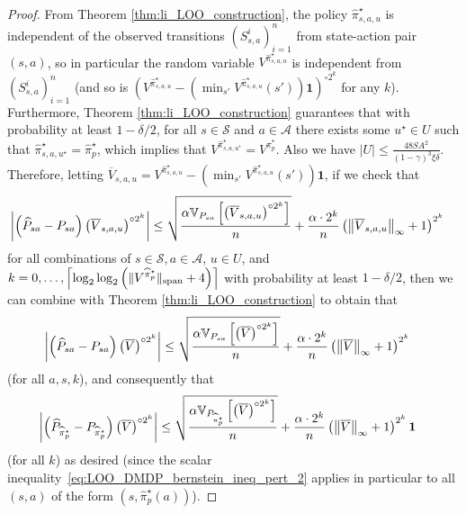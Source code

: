 \documentclass{article}
\theoremstyle{plain}
\theoremstyle{plain}
\theoremstyle{remark}
\theoremstyle{plain}
\theoremstyle{plain}
\newcommand{\Var}{\mathbb{V}}
\newcommand{\Phat}{\widehat{P}}
\newcommand{\pihstar}{\widehat{\pi}^\star}
\newcommand{\one}{\mathbf{1}}
\newcommand{\pihat}{\widehat{\pi}}
\newcommand{\Vc}{\overline{V}}
\newcommand{\A}{\mathcal{A}}
\renewcommand{\S}{\mathcal{S}}
\newcommand{\pihatpert}{\pihat^\star_p}
\begin{document}
\begin{proof} 
    From Theorem \ref{thm:li_LOO_construction}, the policy $\pihstar_{s,a,u}$ is independent of the observed transitions $(S^i_{s,a})_{i=1}^n$ from state-action pair $(s,a)$, so in particular the random variable $V^{\pihstar_{s,a,u}}$ is independent from $(S^i_{s,a})_{i=1}^n$ (and so is $\left(V^{\pihstar_{s,a,u}} - \left( \min_{s'} V^{\pihstar_{s,a,u}}(s')\right) \one \right)^{\circ 2^k}$ for any $k$).
    Furthermore, Theorem \ref{thm:li_LOO_construction} guarantees that with probability at least $1 - \delta/2$, for all $s \in \S$ and $a \in \A$ there exists some $u^\star \in U$ such that $\pihstar_{s,a,u^\star} = \pihatpert$, which implies that $V^{\pihstar_{s,a,u^\star}}  = V^{\pihatpert}$.
    Also we have $|U| \leq \frac{48 SA^2}{(1-\gamma)^3 \xi \delta}$. Therefore, letting $\Vc_{s,a,u} = V^{\pihstar_{s,a,u}} - \left( \min_{s'} V^{\pihstar_{s,a,u}}(s')\right) \one$, if we check that
    \begin{align}
        \left| \left(\Phat_{sa} - P_{sa}\right) \left( \Vc_{s,a,u} \right)^{\circ 2^k} \right|
    &\leq \sqrt{\frac{\alpha   \Var_{P_{sa}} \left[ \left(\Vc_{s,a,u} \right)^{\circ 2^k}  \right]    }{n }} + \frac{ \alpha \cdot 2^k }{n}  \left( \infnorm{\Vc_{s,a,u}} + 1\right)^{2^k}   \label{eq:LOO_DMDP_bernstein_ineq_pert}
    \end{align}
    for all combinations of $s \in \S, a \in \A$, $u \in U$, and $k = 0, \dots, \left\lceil\log_2 \log_2 \left( \spannorm{V^{\pihatpert}} + 4\right) \right\rceil$ with probability at least $1 - \delta/2$, then we can combine with Theorem \ref{thm:li_LOO_construction} to obtain that
    \begin{align}
        \left| \left(\Phat_{sa} - P_{sa}\right) \left( \Vc \right)^{\circ 2^k} \right|
        &\leq \sqrt{\frac{\alpha   \Var_{P_{sa}} \left[ \left(\Vc \right)^{\circ 2^k}  \right]    }{n }} + \frac{ \alpha \cdot 2^k }{n}  \left( \infnorm{\Vc} + 1\right)^{2^k}   \label{eq:LOO_DMDP_bernstein_ineq_pert_2}
    \end{align}
    (for all $a,s,k$), and consequently that
    \begin{align*}
        \left| \left(\Phat_{\pihatpert} - P_{\pihatpert}\right) \left( \Vc \right)^{\circ 2^k} \right|
    &\leq \sqrt{\frac{\alpha   \Var_{P_{\pihatpert}} \left[ \left(\Vc \right)^{\circ 2^k}  \right]    }{n }} + \frac{ \alpha \cdot 2^k }{n}  \left( \infnorm{\Vc} + 1\right)^{2^k}   \one
    \end{align*}
    (for all $k$) as desired (since the scalar inequality~\eqref{eq:LOO_DMDP_bernstein_ineq_pert_2} applies in particular to all $(s,a)$ of the form $(s, \pihatpert(a))$).
    

\end{proof}
\end{document}

